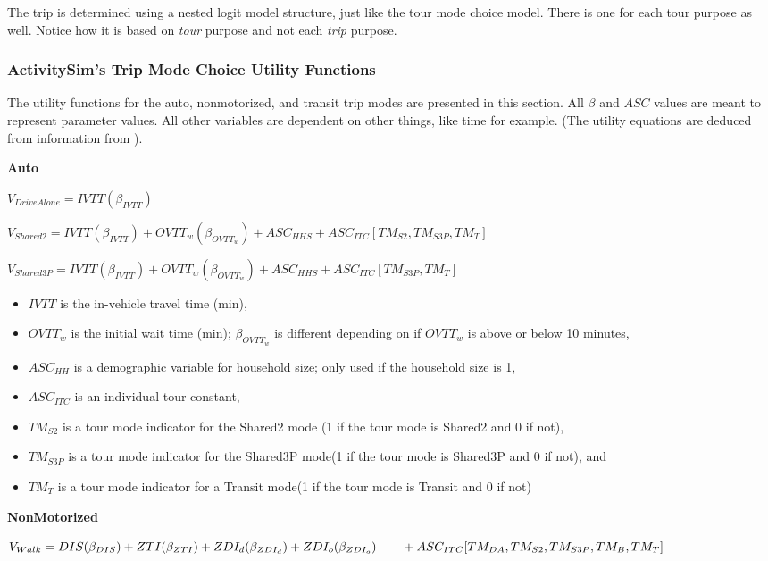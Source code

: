 \documentclass[3p, authoryear, review]{elsarticle} %
\providecommand{\tightlist}{%
  \setlength{\itemsep}{0pt}\setlength{\parskip}{0pt}}
\begin{document}
The trip is determined using a nested logit model structure, just like the tour mode choice model. There is one for each tour purpose as well. Notice how it is based on \emph{tour} purpose and not each \emph{trip} purpose.

\hypertarget{lit421}{%
\subsubsection{ActivitySim's Trip Mode Choice Utility Functions}\label{lit421}}

The utility functions for the auto, nonmotorized, and transit trip modes are presented in this section. All \(\beta\) and \(ASC\) values are meant to represent parameter values. All other variables are dependent on other things, like time for example. (The utility equations are deduced from information from \citet{mtc12}).

\textbf{Auto}

\(V_{DriveAlone} = IVTT(\beta_{IVTT})\)

\(V_{Shared2} = IVTT(\beta_{IVTT}) + OVTT_w(\beta_{OVTT_w}) + ASC_{HHS} + ASC_{ITC}[TM_{S2}, TM_{S3P}, TM_T]\)

\(V_{Shared3P} = IVTT(\beta_{IVTT}) + OVTT_w(\beta_{OVTT_w}) + ASC_{HHS} + ASC_{ITC}[TM_{S3P}, TM_T]\)

\begin{itemize}
\tightlist
\item
  \(IVTT\) is the in-vehicle travel time (min),
\item
  \(OVTT_w\) is the initial wait time (min); \(\beta_{OVTT_w}\) is different depending on if \(OVTT_w\) is above or below 10 minutes,
\item
  \(ASC_{HH}\) is a demographic variable for household size; only used if the household size is 1,
\item
  \(ASC_{ITC}\) is an individual tour constant,
\item
  \(TM_{S2}\) is a tour mode indicator for the Shared2 mode (1 if the tour mode is Shared2 and 0 if not),
\item
  \(TM_{S3P}\) is a tour mode indicator for the Shared3P mode(1 if the tour mode is Shared3P and 0 if not), and
\item
  \(TM_{T}\) is a tour mode indicator for a Transit mode(1 if the tour mode is Transit and 0 if not)
\end{itemize}

\textbf{NonMotorized}

\(V_{Walk} = DIS(\beta_{DIS}) + ZTI(\beta_{ZTI}) + ZDI_d(\beta_{ZDI_d}) + ZDI_o(\beta_{ZDI_o}) \\ \qquad+ ASC_{ITC}[TM_{DA}, TM_{S2}, TM_{S3P}, TM_{B}, TM_{T}]\)
\end{document}
